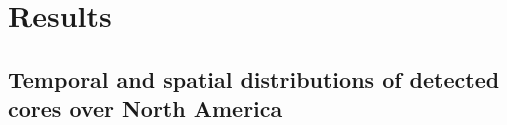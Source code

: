 


\section{Results}


\subsection{Temporal and spatial distributions of detected cores over North America} \label{sec:core_properties}


